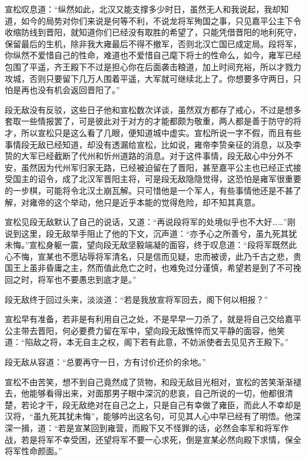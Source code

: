 宣松叹息道：“纵然如此，北汉又能支撑多少时日，虽然无人和我说起，我却知道，如今的局势对你们来说是何等不利，不说龙将军殉国之事，只见嘉平公主下令收缩防线到晋阳，就知道你们已经没有取胜的希望了，只能凭借晋阳的地利死守，保留最后的生机，除非我大雍最后不得不撤军，否则北汉亡国已成定局。段将军，你纵然不爱惜自己的性命，难道也不爱惜自己麾下将士的性命么，如今，雍军已经包围了平遥，齐王殿下不过是担心你在后面袭击粮道，加上时间充裕，所以才戮力攻城，否则只要留下几万人围着平遥，大军就可继续北上了。你想要多守两日，只怕是再也没有机会返回晋阳了。”

段无敌没有反驳，这些日子他和宣松数次详谈，虽然双方都存了戒心，不过是想多套取一些情报罢了，可是彼此对于对方的才能都颇为敬重，两人都是善于防守的将才，所以宣松只是这么看了几眼，便知道城中虚实。宣松所说一字不假，而且有些事情段无敌已经知道，却没有透漏给宣松，比如说，雍帝李贽亲征的消息，以及李贽的大军已经截断了代州和忻州道路的消息。对于这件事情，段无敌心中分外不安，虽然因为代州军归家无路，已经被迫留在了晋阳，甚至嘉平公主也已经正式接受国主的诏令，成了北汉军晋阳主将，可是段无敌隐隐觉得，这恐怕是雍军很重要的一步棋，可能将令北汉土崩瓦解。只可惜他是一个军人，有些事情他还是不甚了解，对雍帝的这个举动，他只是近乎本能的觉得危险，却不知其真意。

宣松见段无敌默认了自己的说话，又道：“再说段将军的处境似乎也不大好……”刚说到这里，段无敌举手阻止了他的下文，沉声道：“亦予心之所善兮，虽九死其犹未悔。”宣松身躯一震，望向段无敌坚毅端凝的面容，终于叹息道：“段将军既然此心不悔，宣某也不愿玷辱将军清名，只是信而见疑，忠而被谤，此乃千古之悲，贵国王上虽非昏庸之主，然而值此危亡之时，也难免过分谨慎，希望若是到了不可挽回之时，将军也不要愚忠到底才是。”

段无敌终于回过头来，淡淡道：“若是我放宣将军回去，阁下何以相报？”

宣松早有准备，若非是有利用自己之处，不是早早一刀杀了，就是将自己交给嘉平公主带去晋阳，何必要费力留在军中，望向段无敌憔悴而又平静的面容，他笑道：“陷敌之将，本无自主之权，阁下若有此意，不妨派使者去见见齐王殿下。”

段无敌从容道：“总要再守一日，方有讨价还价的余地。”

宣松不由苦笑，想不到自己竟然成了货物，和段无敌目光相对，宣松的苦笑渐渐褪去，他能够看得出来，对面那男子眼中深沉的悲哀，自己所说的一切，他都很清楚，若论才干，段无敌绝对在自己之上，只是自己有幸做了雍臣，而此人不幸却是汉将，“虽九死其犹未悔”，能够吟出这名句，可见其人心中早已经有了明悟。他深深一揖，道：“若是宣某回到雍营，而殿下又不怪罪的话，必然会率军和将军作战，若是将军不幸受困，还望将军不要一心求死，倒是宣某必然向殿下求情，保全将军性命颜面。”


